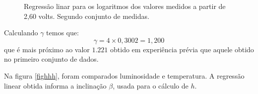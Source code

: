 \documentclass[brazilian,12pt,a4paper,final]{article}
\begin{document}
\begin{figure}[htbp!]
  \caption{Regressão linar para os logaritmos dos valores medidos a partir de 2,60 volts. Segundo conjunto de medidas.}
  \label{figfimpeq2}
  \centering
\end{figure}

Calculando $\gamma$ temos que:
$$\gamma=4\times 0,3002=1,200$$
que é mais próximo ao valor $1.221$ obtido em experiência prévia que 
aquele obtido no primeiro conjunto de dados.

Na figura \ref{fighhh}, foram comparados luminosidade e temperatura. A regressão linear obtida informa a inclinação $\beta$, usada para o cálculo de $h$.
\end{document}
